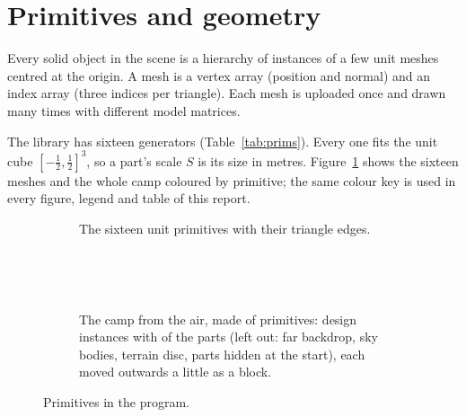 \section{Primitives and geometry}
\label{sec:prims}
Every solid object in the scene is a hierarchy of instances of a few unit meshes centred at the origin. A mesh is a
vertex array (position and normal) and an index array (three indices per triangle). Each mesh is uploaded once and
drawn many times with different model matrices.

The library has sixteen generators (Table~\ref{tab:prims}). Every one fits the unit cube $[-\tfrac12,\tfrac12]^3$,
so a part's scale $S$ is its size in metres. Figure~\ref{fig:prims} shows the sixteen meshes and the whole camp
coloured by primitive; the same colour key is used in every figure, legend and table of this report.

\begin{figure}[tbp]
\centering
\begin{subfigure}[t]{\linewidth}\centering\primgridkey\caption{The sixteen unit primitives with their triangle edges.}\end{subfigure}\\[2mm]
\begin{subfigure}[t]{\linewidth}\centering{}\\[1mm]
{\fontsize{7}{8.5}\selectfont\begin{minipage}{0.86\linewidth}\centering\campkey\end{minipage}}
\caption{The camp from the air, made of primitives: \campinst{} design instances with \campparts{} of the \nLeaves{} parts (left out: far backdrop, sky bodies, terrain disc, parts hidden at the start), each moved outwards a little as a block.}\end{subfigure}
\caption{Primitives in the program.}
\label{fig:prims}
\end{figure}

\begin{table}[tbp]
\caption{The primitive library. Instances are counted over the whole scene.}\label{tab:prims}
\centering\footnotesize\setlength{\tabcolsep}{3pt}
\resizebox{\linewidth}{!}{\primtable}
\end{table}

\begin{table}[tbp]
\caption{Where each primitive is used: number of scene parts and the most frequent part kinds.}\label{tab:primuse}
\centering\footnotesize
\primusetable
\end{table}

